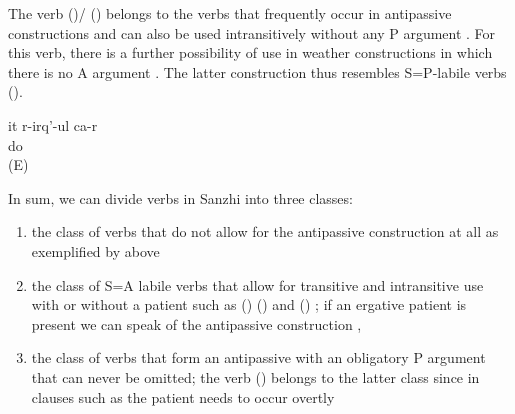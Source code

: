 The verb  ()\slash{} ()  belongs to the verbs that frequently occur in antipassive constructions  and can also be used intransitively without any P argument . For this verb, there is a further possibility of use in weather constructions in which there is no A argument . The latter construction thus resembles S=P-labile verbs ().
%
\begin{exe}
	\ex	\label{ex:She is busy}
	\gll	it	r-irq'-ul	ca-r\\
			do	\\
	\glt	{} (E)
\end{exe}

In sum, we can divide verbs in Sanzhi into three classes:
%
\begin{enumerate}
	\item	the class of verbs that do not allow for the antipassive construction at all as exemplified by  above
	\item	the class of S=A labile verbs that allow for transitive and intransitive use with or without a patient such as  () ()  and  () ; if an ergative patient is present we can speak of the antipassive construction , 
	\item	the class of verbs that form an antipassive with an obligatory P argument that can never be omitted; the verb  ()  belongs to the latter class since in clauses such as  the patient needs to occur overtly
\end{enumerate}

